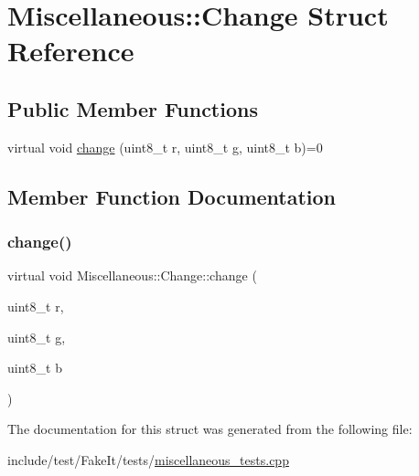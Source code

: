 \hypertarget{structMiscellaneous_1_1Change}{}\section{Miscellaneous\+::Change Struct Reference}
\label{structMiscellaneous_1_1Change}
\subsection*{Public Member Functions}
\begin{DoxyCompactItemize}
\item 
virtual void \mbox{\hyperlink{structMiscellaneous_1_1Change_aed9b4899e7ed523b704c48d1eb82553b}{change}} (uint8\+\_\+t r, uint8\+\_\+t g, uint8\+\_\+t b)=0
\end{DoxyCompactItemize}


\subsection{Member Function Documentation}
\mbox{\label{structMiscellaneous_1_1Change_aed9b4899e7ed523b704c48d1eb82553b}} 
\subsubsection{\texorpdfstring{change()}{change()}}
{\footnotesize\ttfamily virtual void Miscellaneous\+::\+Change\+::change (\begin{DoxyParamCaption}\item[{uint8\+\_\+t}]{r,  }\item[{uint8\+\_\+t}]{g,  }\item[{uint8\+\_\+t}]{b }\end{DoxyParamCaption})\hspace{0.3cm}{\ttfamily [pure virtual]}}



The documentation for this struct was generated from the following file\+:\begin{DoxyCompactItemize}
\item 
include/test/\+Fake\+It/tests/\mbox{\hyperlink{miscellaneous__tests_8cpp}{miscellaneous\+\_\+tests.\+cpp}}\end{DoxyCompactItemize}
